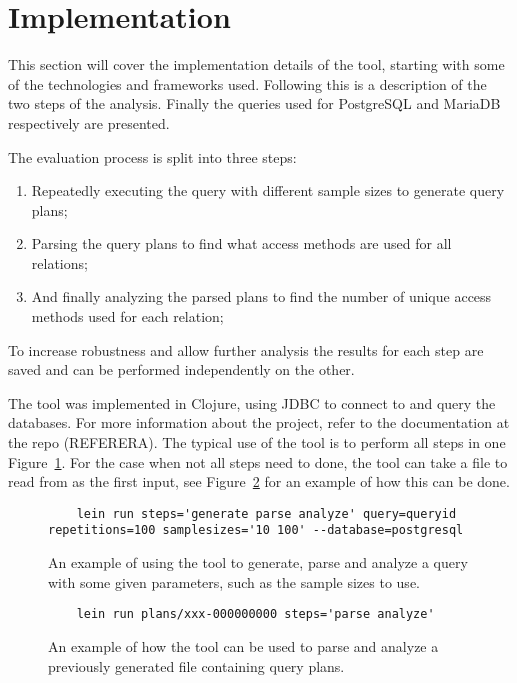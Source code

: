 \section{Implementation}
This section will cover the implementation details of the tool, starting with
some of the technologies and frameworks used. Following this is a description of
the two steps of the analysis. Finally the queries used for PostgreSQL and
MariaDB respectively are presented.

The evaluation process is split into three steps:
\begin{enumerate}
\item Repeatedly executing the query with different sample sizes to generate
  query plans;
\item Parsing the query plans to find what access methods are used for all
  relations;
\item And finally analyzing the parsed plans to find the number of unique access
  methods used for each relation;
\end{enumerate}

To increase robustness and allow further analysis the results for each step are
saved and can be performed independently on the other.

The tool was implemented in Clojure, using JDBC to connect to and query the
databases. For more information about the project, refer to the documentation at
the repo (REFERERA). The typical use of the tool is to perform all steps in one
Figure~\ref{fig:cmd:runtool1}. For the case when not all steps need to done, the
tool can take a file to read from as the first input, see
Figure~\ref{fig:cmd:runtool2} for an example of how this can be done.

\begin{figure}[ht]
  \begin{verbatim}
    lein run steps='generate parse analyze' query=queryid repetitions=100 samplesizes='10 100' --database=postgresql
  \end{verbatim}
  \caption[Using the tool to generate, parse and analyze a query]{An example of
    using the tool to generate, parse and analyze a query with some given
    parameters, such as the sample sizes to use.}
  \label{fig:cmd:runtool1}
\end{figure}

\begin{figure}[ht]
  \begin{verbatim}
    lein run plans/xxx-000000000 steps='parse analyze'
  \end{verbatim}
  \caption[Using the tool to parse and analyze a previously generated plan]{An
    example of how the tool can be used to parse and analyze a previously
    generated file containing query plans.}
  \label{fig:cmd:runtool2}
\end{figure}

